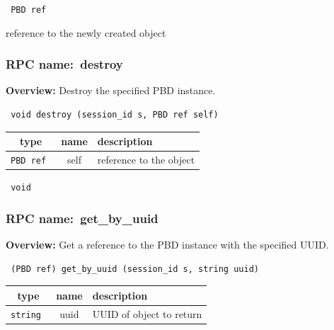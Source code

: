 \vspace{0.3cm}

{\tt 
PBD ref
}


reference to the newly created object
\vspace{0.3cm}
\vspace{0.3cm}
\vspace{0.3cm}
\subsubsection{RPC name:~destroy}

{\bf Overview:} 
Destroy the specified PBD instance.

\begin{verbatim} void destroy (session_id s, PBD ref self)\end{verbatim}



 
\vspace{0.3cm}
\begin{tabular}{|c|c|p{7cm}|}
 \hline
{\bf type} & {\bf name} & {\bf description} \\ \hline
{\tt PBD ref } & self & reference to the object \\ \hline 

\end{tabular}

\vspace{0.3cm}

{\tt 
void
}



\vspace{0.3cm}
\vspace{0.3cm}
\vspace{0.3cm}
\subsubsection{RPC name:~get\_by\_uuid}

{\bf Overview:} 
Get a reference to the PBD instance with the specified UUID.

\begin{verbatim} (PBD ref) get_by_uuid (session_id s, string uuid)\end{verbatim}



 
\vspace{0.3cm}
\begin{tabular}{|c|c|p{7cm}|}
 \hline
{\bf type} & {\bf name} & {\bf description} \\ \hline
{\tt string } & uuid & UUID of object to return \\ \hline 

\end{tabular}

